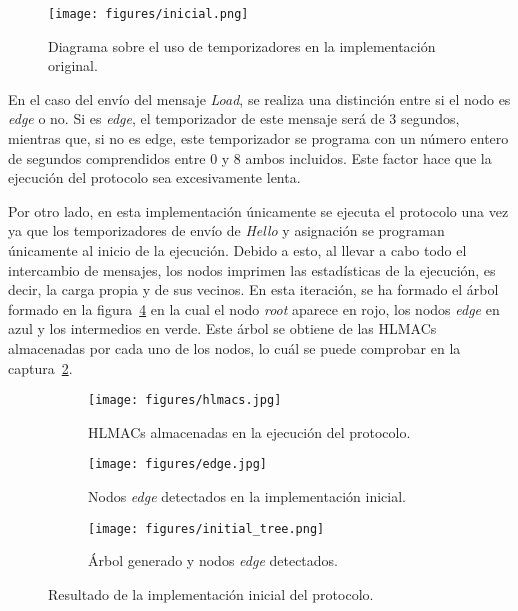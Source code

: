 \begin{figure}[h]
    \centering
    \texttt{[image: figures/inicial.png]}
    \caption{Diagrama sobre el uso de temporizadores en la implementación original.}
    \label{fig:timers-inicial}
\end{figure}

En el caso del envío del mensaje \textit{Load}, se realiza una distinción entre si el nodo es \textit{edge} o no.
Si es \textit{edge}, el temporizador de este mensaje será de 3 segundos, mientras que, si no es edge, este temporizador se programa con un número entero de segundos comprendidos entre 0 y 8 ambos incluidos.
Este factor hace que la ejecución del protocolo sea excesivamente lenta.

Por otro lado, en esta implementación únicamente se ejecuta el protocolo una vez ya que los temporizadores de envío de \textit{Hello} y asignación se programan únicamente al inicio de la ejecución. 
Debido a esto, al llevar a cabo todo el intercambio de mensajes, los nodos imprimen las estadísticas de la ejecución, es decir, la carga propia y de sus vecinos.
En esta iteración, se ha formado el árbol formado en la figura~\ref{subfig:initial_tree} en la cual el nodo \textit{root} aparece en rojo, los nodos \textit{edge} en azul y los intermedios en verde.
Este árbol se obtiene de las \acp{HLMAC} almacenadas por cada uno de los nodos, lo cuál se puede comprobar en la captura~\ref{subfig:initial_hlmacs}.

\begin{figure}[h]
    \centering
    \begin{subfigure}[b]{\textwidth}
        \centering
        \texttt{[image: figures/hlmacs.jpg]}
        \caption{\acp{HLMAC} almacenadas en la ejecución del protocolo.}
        \label{subfig:initial_hlmacs}
    \end{subfigure}
    
    \begin{subfigure}[b]{\textwidth}
        \centering
        \texttt{[image: figures/edge.jpg]}
        \caption{Nodos \textit{edge} detectados en la implementación inicial.}
        \label{subfig:initial_edge}
    \end{subfigure}

    \begin{subfigure}[b]{0.75\textwidth}
        \centering
        \texttt{[image: figures/initial\_tree.png]}
        \caption{Árbol generado y nodos \textit{edge} detectados.}
        \label{subfig:initial_tree}
    \end{subfigure}
       \caption{Resultado de la implementación inicial del protocolo.}
       \label{fig:initial_result}
\end{figure}

